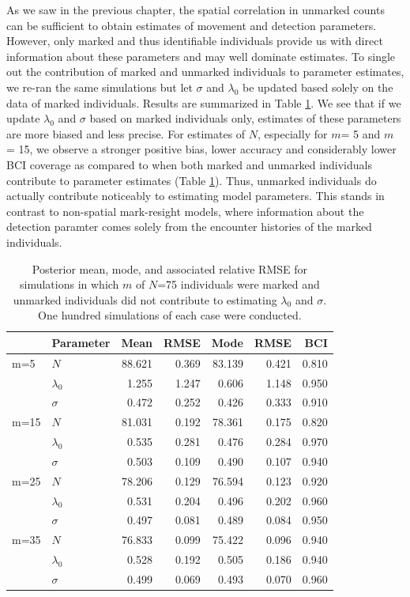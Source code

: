 As we saw in the previous chapter, the spatial correlation in unmarked
counts can be sufficient to obtain estimates of movement and detection
parameters. However, only marked and thus identifiable individuals
provide us with direct information about these parameters and may well
dominate estimates.  To single out the contribution of marked and
unmarked individuals to parameter estimates, we re-ran the same
simulations but let $\sigma$ and $\lambda_0$ be updated based solely
on the data of marked individuals. Results are summarized in
Table \ref{partialID.tab.sim2}.  We see that if we update $\lambda_0$
and $\sigma$ based on marked individuals only, estimates of these
parameters are more biased and less precise. For estimates of $N$,
especially for $m$= 5 and $m$ = 15, we observe a stronger positive
bias, lower accuracy and considerably lower BCI coverage as compared
to when both marked and unmarked individuals contribute to parameter
estimates (Table \ref{partialID.tab.sim2}). Thus, unmarked individuals
do actually contribute noticeably to estimating model parameters. This stands in contrast to non-spatial mark-resight models, where information about the detection paramter comes solely from the encounter histories of the marked individuals.

\begin{table}[ht]
\centering
\caption{Posterior mean, mode, and associated relative RMSE for simulations in
  which $m$ of $N$=75 individuals were marked and unmarked individuals
  did not contribute to estimating $\lambda_0$ and $\sigma$.
  One hundred simulations of each case were conducted. }
\begin{tabular}{llrrrrr}
\hline
     &	Parameter    &	Mean   &	RMSE  &	Mode   &	RMSE &	BCI    \\
     \hline
 m=5 &	$N$          &	88.621 &	0.369 &	83.139 &	0.421 &	0.810  \\
     &	$\lambda_0$  &	1.255  &	1.247 &	0.606  &	1.148 &	0.950  \\
     &	$\sigma$     &	0.472  &	0.252 &	0.426  &	0.333 &	0.910  \\
     \hline
 m=15&	$N$          &	81.031 &	0.192 &	78.361 &	0.175 &	0.820  \\
     &	$\lambda_0$  &	0.535  &	0.281 &	0.476  &	0.284 &	0.970  \\
     &	$\sigma$     &	0.503  &	0.109 &	0.490  &	0.107 &	0.940  \\
     \hline
 m=25&	$N$          &	78.206 &	0.129 &	76.594 &	0.123 &	0.920  \\
     &	$\lambda_0$  &	0.531  &	0.204 &	0.496  &	0.202 &	0.960  \\
     &	$\sigma$     &	0.497  &	0.081 &	0.489  &	0.084 &	0.950  \\
     \hline
 m=35&	$N$          &	76.833 &	0.099 &	75.422 &	0.096 &	0.940  \\
     &	$\lambda_0$  &	0.528  &	0.192 &	0.505  &	0.186 &	0.940  \\
     &	$\sigma$     &	0.499  &	0.069 &	0.493  &	0.070 &	0.960  \\
 \hline
\end{tabular}
\label{partialID.tab.sim2}
\end{table}


